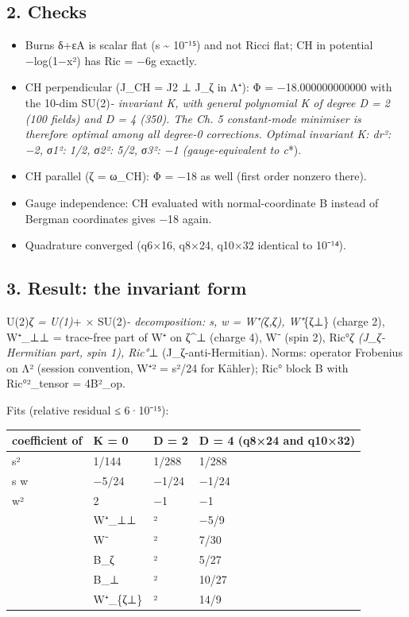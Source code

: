 \documentclass[
  10pt,
]{report}
\providecommand{\tightlist}{%
  \setlength{\itemsep}{0pt}\setlength{\parskip}{0pt}}
\begin{document}
\hypertarget{checks}{%
\subsection{2. Checks}\label{checks}}

\begin{itemize}
\tightlist
\item
  Burns δ+εA is scalar flat (\textbar s\textbar{} \textasciitilde{}
  10⁻¹⁵) and not Ricci flat; CH in potential −log(1−\textbar x\textbar²)
  has Ric = −6g exactly.
\item
  CH perpendicular (J\_CH = J2 ⊥ J\_ζ in Λ⁺): Φ = −18.000000000000 with
  the 10-dim SU(2)\emph{- invariant K, with general polynomial K of
  degree D = 2 (100 fields) and D = 4 (350). The Ch. 5 constant-mode
  minimiser is therefore optimal among all degree-0 corrections. Optimal
  invariant K: dr²: −2, σ1²: 1/2, σ2²: 5/2, σ3²: −1 (gauge-equivalent to
  c}*).
\item
  CH parallel (ζ = ω\_CH): Φ = −18 as well (first order nonzero there).
\item
  Gauge independence: CH evaluated with normal-coordinate B instead of
  Bergman coordinates gives −18 again.
\item
  Quadrature converged (q6×16, q8×24, q10×32 identical to 10⁻¹⁴).
\end{itemize}

\hypertarget{result-the-invariant-form}{%
\subsection{3. Result: the invariant
form}\label{result-the-invariant-form}}

U(2)\emph{ζ = U(1)}+ × SU(2)\emph{- decomposition: s, w = W⁺(ζ,ζ),
W⁺}\{ζ⊥\} (charge 2), W⁺\_⊥⊥ = trace-free part of W⁺ on ζ\^{}⊥ (charge
4), W⁻ (spin 2), Ric°\emph{ζ (J\_ζ-Hermitian part, spin 1), Ric°}⊥
(J\_ζ-anti-Hermitian). Norms: operator Frobenius on Λ² (session
convention, \textbar W⁺\textbar² = s²/24 for Kähler); Ric° block B with
\textbar Ric°\textbar²\_tensor = 4\textbar B\textbar²\_op.

Fits (relative residual ≤ 6·10⁻¹⁵):

\begin{longtable}[]{@{}llll@{}}
\toprule
coefficient of & K = 0 & D = 2 & D = 4 (q8×24 and q10×32)\tabularnewline
\midrule
\endhead
s² & 1/144 & 1/288 & 1/288\tabularnewline
s w & −5/24 & −1/24 & −1/24\tabularnewline
w² & 2 & −1 & −1\tabularnewline
& W⁺\_⊥⊥ & ² & −5/9\tabularnewline
& W⁻ & ² & 7/30\tabularnewline
& B\_ζ & ² & 5/27\tabularnewline
& B\_⊥ & ² & 10/27\tabularnewline
& W⁺\_\{ζ⊥\} & ² & 14/9\tabularnewline
\bottomrule
\end{longtable}
\end{document}
